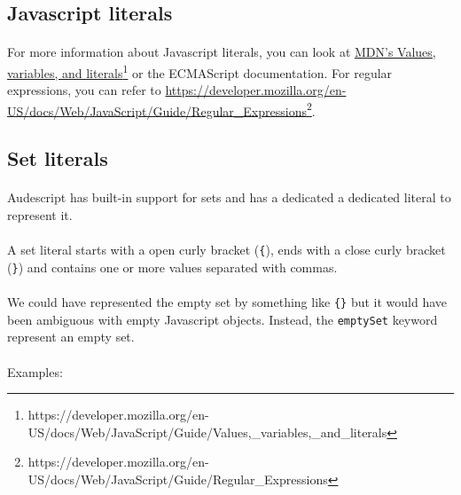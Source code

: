 \documentclass{article}
\begin{document}
\begin{sloppypar}
\subsection{ Javascript literals}

{}
      
\paragraph{}
For more information about Javascript literals, you can look at \href{MDN's%20Values+%20variables+%20and%20literals}{MDN's Values, variables, and literals}\footnote{https://developer.mozilla.org/en-US/docs/Web/JavaScript/Guide/Values,\_variables,\_and\_literals} or the ECMAScript documentation.
      For regular expressions, you can refer to \href{https://developer.mozilla.org/en-US/docs/Web/JavaScript/Guide/Regular\_Expressions}{https://developer.mozilla.org/en-US/docs/Web/JavaScript/Guide/Regular\_Expressions}\footnote{https://developer.mozilla.org/en-US/docs/Web/JavaScript/Guide/Regular\_Expressions}.
   

   

\subsection{ Set literals}


\paragraph{}
Audescript has built-in support for sets and has a dedicated a dedicated literal to represent it.

      
\paragraph{}
A set literal starts with a open curly bracket (\verb!{!), ends with a close curly bracket (\verb!}!) and contains one or more values separated with commas.

      
\paragraph{}
We could have represented the empty set by something like \verb!{}! but it would have been ambiguous with empty Javascript objects. Instead, the \verb!emptySet! keyword represent an empty set.

      
\paragraph{}
Examples:


\end{sloppypar}
\end{document}
